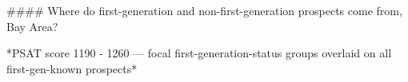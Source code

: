 #### Where do first-generation and non-first-generation prospects come from, Bay Area?

*PSAT score 1190 - 1260 — focal first-generation-status groups overlaid on all first-gen-known prospects*
